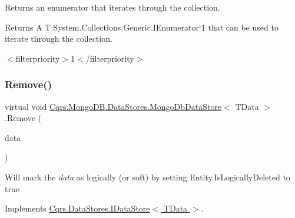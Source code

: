 Returns an enumerator that iterates through the collection. 

\begin{DoxyReturn}{Returns}
A T\+:\+System.\+Collections.\+Generic.\+I\+Enumerator`1 that can be used to iterate through the collection. 
\end{DoxyReturn}
$<$filterpriority$>$1$<$/filterpriority$>$ \mbox{\label{classCqrs_1_1MongoDB_1_1DataStores_1_1MongoDbDataStore_a14b43546e8d1e1832358e1cf2f8535f1_a14b43546e8d1e1832358e1cf2f8535f1}} 
\subsubsection{\texorpdfstring{Remove()}{Remove()}}
{\footnotesize\ttfamily virtual void \hyperlink{classCqrs_1_1MongoDB_1_1DataStores_1_1MongoDbDataStore}{Cqrs.\+Mongo\+D\+B.\+Data\+Stores.\+Mongo\+Db\+Data\+Store}$<$ T\+Data $>$.Remove (\begin{DoxyParamCaption}\item[{T\+Data}]{data }\end{DoxyParamCaption})\hspace{0.3cm}{\ttfamily [virtual]}}



Will mark the {\itshape data}  as logically (or soft) by setting Entity.\+Is\+Logically\+Deleted to true 



Implements \hyperlink{interfaceCqrs_1_1DataStores_1_1IDataStore_a7ef540796bbe4257296841590bc23478_a7ef540796bbe4257296841590bc23478}{Cqrs.\+Data\+Stores.\+I\+Data\+Store$<$ T\+Data $>$}.

\mbox{\label{classCqrs_1_1MongoDB_1_1DataStores_1_1MongoDbDataStore_ac0cb8626e8f8ab0275a31e88a920ee3e_ac0cb8626e8f8ab0275a31e88a920ee3e}} 
